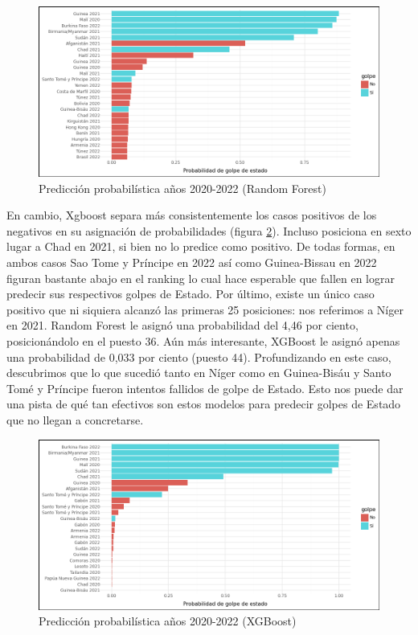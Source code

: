 \documentclass{article}
\begin{document}
\begin{figure}[H]
  \centering  
  \includegraphics[width=1\textwidth]{5_prob_rf.png}
  \caption{Predicción probabilística años 2020-2022 (Random Forest) \label{fig:prob_rf}}
\end{figure}

En cambio, Xgboost separa  más consistentemente los casos positivos de los negativos
en su asignación de probabilidades (figura \ref{fig:prob_xgb}). Incluso posiciona en sexto lugar
a Chad en 2021, si bien no lo predice como positivo. De todas formas, en ambos casos 
Sao Tome y Príncipe en 2022 así como Guinea-Bissau en 2022 figuran bastante abajo en el ranking
lo cual hace esperable que fallen en lograr predecir sus respectivos golpes de Estado. Por 
último, existe un único caso positivo que ni siquiera alcanzó las primeras 25 posiciones: nos
referimos a Níger en 2021. Random Forest le asignó una probabilidad del 4,46 por ciento, 
posicionándolo en el puesto 36. Aún más interesante, XGBoost le asignó apenas una probabilidad
de 0,033 por ciento (puesto 44). Profundizando en este caso, descubrimos que lo que sucedió tanto en 
Níger como en Guinea-Bisáu y Santo Tomé y Príncipe fueron intentos fallidos de golpe de Estado.
Esto nos puede dar una pista de qué tan efectivos son estos modelos para predecir golpes de Estado 
que no llegan a concretarse.

\begin{figure}[H]
  \centering  
  \includegraphics[width=1\textwidth]{6_prob_xgb.png}
  \caption{Predicción probabilística años 2020-2022 (XGBoost) \label{fig:prob_xgb}}
\end{figure}
\end{document}

